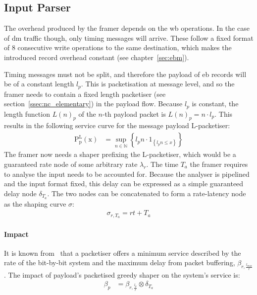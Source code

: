 \subsection{Input Parser}
The overhead produced by the framer depends on the \gls{wb} operations. In the case of \gls{dm} traffic though, only timing messages will arrive.
These follow a fixed format of 8 consecutive write operations to the same destination, which makes the introduced record overhead constant (see chapter~\ref{sec:ebm}).
\par
Timing messages must not be split, and therefore the payload of \gls{eb} records will be of a constant length $l_p$.
This is packetisation at message level, and so the framer needs to contain a fixed length packetiser (see section~\ref{ssec:nc_elementary}) in the payload flow.
Because $l_p$ is constant, the length function $L(n)_p$ of the $n$-th payload packet is $L(n)_p = n \cdot l_p$.
This results in the following service curve for the message payload L-packetiser:
%
\begin{align}
\mathrm{P^L_{p}(x)} &= \sup_{n \in \mathbb{N}}\left\{ l_p n \cdot 1_{\left\{l_p n\le x\right\}}\right\}
\label{eq:lpac_p_framer}
\end{align}
%
The framer now needs a shaper prefixing the L-packetiser, which would be a guaranteed rate node of some arbitrary rate $\lambda_r$.
The time $T_a$ the framer requires to analyse the input needs to be accounted for. Because the analyser is pipelined
and the input format fixed, this delay can be expressed as a simple guaranteed delay node $\delta_{T_a}$. The two nodes can be concatenated to form a rate-latency node as the shaping curve $\sigma$:
%
\begin{equation}
\begin{aligned}
\sigma_{r, T_a} = rt + T_a
\label{eq:lpac_p_sigma}
\end{aligned}
\end{equation}
%
\paragraph{Impact}
It is known from~\cite[p. 43]{thiran_network_2001} that a packetiser offers a minimum service described by the rate of the bit-by-bit system and
the maximum delay from packet buffering, $\beta_{r,\frac{l_{max}}{r}}$. The impact of payload's packetised greedy shaper on the system's service is:
%
\begin{equation}
\begin{aligned}
\beta_{p}  &= \beta_{r,\frac{l_p}{r}} \otimes \delta_{T_a}
\label{eq:lpac_p_beta}
\end{aligned}
\end{equation}
%
